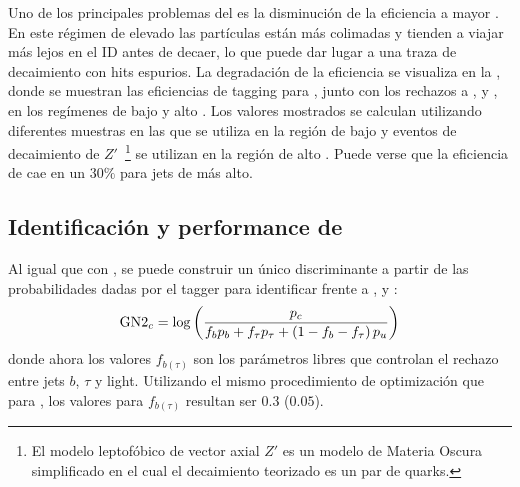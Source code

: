 Uno de los principales problemas del \btagging es la disminución de la eficiencia a mayor \pt. En este régimen de \pt elevado las partículas están más colimadas y tienden a viajar más lejos en el \ac{ID} antes de decaer, lo que puede dar lugar a una traza de decaimiento con hits espurios. La degradación de la eficiencia se visualiza en la \Tab{\ref{tab:objects:ftag:btag_efficiency_original}}, donde se muestran las eficiencias de tagging para \bjets, junto con los rechazos a \cjets, \ljets y \tjets, en los regímenes de bajo y alto \pt. Los valores mostrados se calculan utilizando diferentes muestras en las que \ttbar se utiliza en la región de bajo \pt y eventos de decaimiento de \(Z'\)~\footnote{El modelo leptofóbico de vector axial \(Z'\) es un modelo de Materia Oscura simplificado en el cual el decaimiento teorizado es un par de quarks.} se utilizan en la región de alto \pt. Puede verse que la eficiencia de \btag cae en un \(30\%\) para jets de \pt más alto.

\begin{table}[ht!]
    \caption{Medidas de eficiencias de \btagging, y de rechazos de \cjets, \ljets y \tjets, en los regímenes de bajo y alto \pt.}
    \label{tab:objects:ftag:btag_efficiency_original}
\end{table}

\subsection{Identificación y performance de \ctagging}

Al igual que con \btagging, se puede construir un único discriminante a partir de las probabilidades dadas por el tagger para identificar \cjets frente a \bjets, \tjets y \ljets:
\begin{equation}
    \text{GN2}_{c} = \log \left(
        \frac{p_c}{f_b p_b + f_{\tau} p_{\tau} + \left(1-f_b-f_{\tau}\right)p_u}
    \right)
\end{equation}
donde ahora los valores \(f_{b(\tau)}\) son los parámetros libres que controlan el rechazo entre jets \(b\), \(\tau\) y light. Utilizando el mismo procedimiento de optimización que para \btagging, los valores para \(f_{b(\tau)}\) resultan ser \(0.3\) (\(0.05\)).

